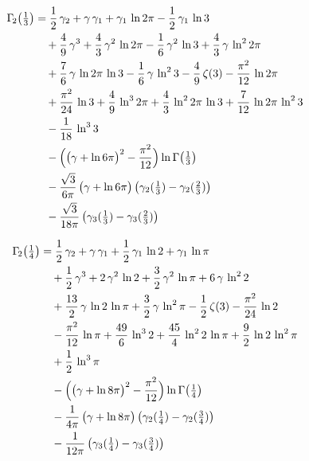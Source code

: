 \begin{align*}
\Gamma_{\!2}\bigl(\tfrac13\bigr) &= \frac{1}{2}\,\gamma_{2}+\gamma\,\gamma_{1}+\gamma_{1}\,\ln 2\pi-\frac{1}{2}\,\gamma_{1}\,\ln 3 \\
 &\quad +\frac{4}{9}\,\gamma^{3}+\frac{4}{3}\,\gamma^{2}\,\ln 2\pi-\frac{1}{6}\,\gamma^{2}\,\ln 3+\frac{4}{3}\,\gamma\,\ln^{2} 2\pi \\
 &\quad +\frac{7}{6}\,\gamma\,\ln 2\pi\,\ln 3-\frac{1}{6}\,\gamma\,\ln^{2} 3-\frac{4}{9}\,\zeta(3)-\frac{\pi^{2}}{12}\,\ln 2\pi \\
 &\quad +\frac{\pi^{2}}{24}\,\ln 3+\frac{4}{9}\,\ln^{3} 2\pi+\frac{4}{3}\,\ln^{2} 2\pi\,\ln 3+\frac{7}{12}\,\ln 2\pi\,\ln^{2} 3 \\
 &\quad -\frac{1}{18}\,\ln^{3} 3 \\
 &\quad -\Bigl(\bigl(\gamma+\ln 6\pi\bigr)^{2}-\frac{\pi^{2}}{12}\Bigr)\ln\Gamma\bigl(\tfrac13\bigr) \\
 &\quad -\frac{\sqrt{3}}{6\pi}\,\bigl(\gamma+\ln 6\pi\bigr)\,\bigl(\gamma_{2}(\tfrac13)-\gamma_{2}(\tfrac23)\bigr) \\
 &\quad -\frac{\sqrt{3}}{18\pi}\,\bigl(\gamma_{3}(\tfrac13)-\gamma_{3}(\tfrac23)\bigr)
\end{align*}

\begin{align*}
\Gamma_{\!2}\bigl(\tfrac14\bigr) &= \frac{1}{2}\,\gamma_{2}+\gamma\,\gamma_{1}+\frac{1}{2}\,\gamma_{1}\,\ln 2+\gamma_{1}\,\ln \pi \\
 &\quad +\frac{1}{2}\,\gamma^{3}+2\,\gamma^{2}\,\ln 2+\frac{3}{2}\,\gamma^{2}\,\ln \pi+6\,\gamma\,\ln^{2} 2 \\
 &\quad +\frac{13}{2}\,\gamma\,\ln 2\,\ln \pi+\frac{3}{2}\,\gamma\,\ln^{2} \pi-\frac{1}{2}\,\zeta(3)-\frac{\pi^{2}}{24}\,\ln 2 \\
 &\quad -\frac{\pi^{2}}{12}\,\ln \pi+\frac{49}{6}\,\ln^{3} 2+\frac{45}{4}\,\ln^{2} 2\,\ln \pi+\frac{9}{2}\,\ln 2\,\ln^{2} \pi \\
 &\quad +\frac{1}{2}\,\ln^{3} \pi \\
 &\quad -\Bigl(\bigl(\gamma+\ln 8\pi\bigr)^{2}-\frac{\pi^{2}}{12}\Bigr)\ln\Gamma\bigl(\tfrac14\bigr) \\
 &\quad -\frac{1}{4\pi}\,\bigl(\gamma+\ln 8\pi\bigr)\,\bigl(\gamma_{2}(\tfrac14)-\gamma_{2}(\tfrac34)\bigr) \\
 &\quad -\frac{1}{12\pi}\,\bigl(\gamma_{3}(\tfrac14)-\gamma_{3}(\tfrac34)\bigr)
\end{align*}

